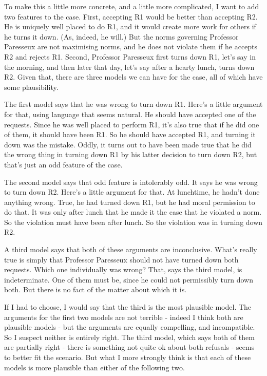 \documentclass[
  10pt,
  letterpaper,
  twoside]{scrbook}
\begin{document}
To make this a little more concrete, and a little more complicated, I
want to add two features to the case. First, accepting R1 would be
better than accepting R2. He is uniquely well placed to do R1, and it
would create more work for others if he turns it down. (As, indeed, he
will.) But the norms governing Professor Paresseux are not maximising
norms, and he does not violate them if he accepts R2 and rejects R1.
Second, Professor Paresseux first turns down R1, let's say in the
morning, and then later that day, let's say after a hearty lunch, turns
down R2. Given that, there are three models we can have for the case,
all of which have some plausibility.

The first model says that he was wrong to turn down R1. Here's a little
argument for that, using language that seems natural. He should have
accepted one of the requests. Since he was well placed to perform R1,
it's also true that if he did one of them, it should have been R1. So he
should have accepted R1, and turning it down was the mistake. Oddly, it
turns out to have been made true that he did the wrong thing in turning
down R1 by his latter decision to turn down R2, but that's just an odd
feature of the case.

The second model says that odd feature is intolerably odd. It says he
was wrong to turn down R2. Here's a little argument for that. At
lunchtime, he hadn't done anything wrong. True, he had turned down R1,
but he had moral permission to do that. It was only after lunch that he
made it the case that he violated a norm. So the violation must have
been after lunch. So the violation was in turning down R2.

A third model says that both of these arguments are inconclusive. What's
really true is simply that Professor Paresseux should not have turned
down both requests. Which one individually was wrong? That, says the
third model, is indeterminate. One of them must be, since he could not
permissibly turn down both. But there is no fact of the matter about
which it is.

If I had to choose, I would say that the third is the most plausible
model. The arguments for the first two models are not terrible - indeed
I think both are plausible models - but the arguments are equally
compelling, and incompatible. So I suspect neither is entirely right.
The third model, which says both of them are partially right - there is
something not quite ok about both refusals - seems to better fit the
scenario. But what I more strongly think is that each of these models is
more plausible than either of the following two.
\end{document}
